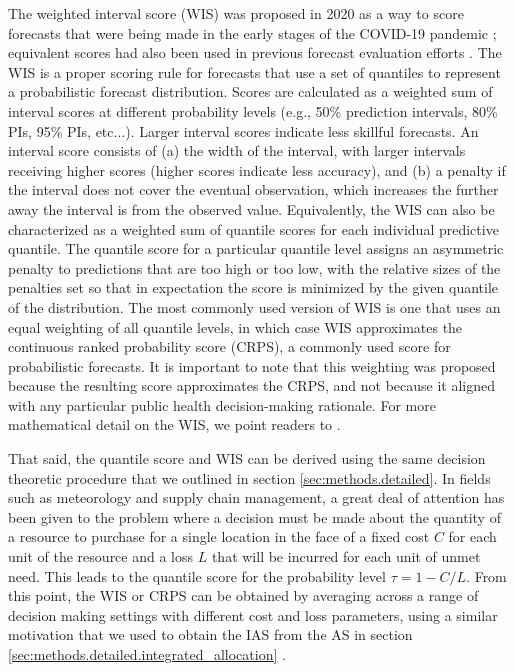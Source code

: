 \documentclass{article}
\begin{document}
The weighted interval score (WIS) was proposed in 2020 as a way to score forecasts that were being made in the early
stages of the COVID-19 pandemic \citep{bracher2021evaluating}; equivalent scores had also been used in previous forecast
evaluation efforts \cite[e.g.,][]{hong2016probabilisticEnergyForecasting}. The WIS is a proper scoring rule for
forecasts that use a set of quantiles to represent a probabilistic forecast distribution. Scores are calculated as a weighted sum of
interval scores at different probability levels (e.g., 50\% prediction intervals, 80\% PIs, 95\% PIs, etc...). Larger
interval scores indicate less skillful forecasts. An interval score consists of (a) the width of the interval, with
larger intervals receiving higher scores (higher scores indicate less accuracy), and (b) a penalty if the interval does
not cover the eventual observation, which increases the further away the interval is from the observed value.
Equivalently, the WIS can also be characterized as a weighted sum of quantile scores for each individual predictive
quantile. The quantile score for a particular quantile level assigns an asymmetric penalty to predictions that are too
high or too low, with the relative sizes of the penalties set so that in expectation the score is minimized by the given
quantile of the distribution. The most commonly used version of WIS is one that uses an equal weighting of all quantile
levels, in which case WIS approximates the continuous ranked probability score (CRPS), a commonly used score for
probabilistic forecasts. It is important to note that this weighting was proposed because the resulting score
approximates the CRPS, and not because it aligned with any particular public health decision-making rationale. For more mathematical detail on the WIS, we point readers to \cite{bracher2021evaluating}.

That said, the quantile score and WIS can be derived using the same decision theoretic procedure that we outlined in
section \ref{sec:methods.detailed}. In fields such as meteorology and supply chain management, a great deal of attention
has been given to the problem where a decision must be made about the quantity of a resource to purchase for a single
location in the face of a fixed cost $C$ for each unit of the resource and a loss $L$ that will be incurred for each
unit of unmet need. This leads to the quantile score for the probability level $\tau = 1 - C/L$. From this point, the
WIS or CRPS can be obtained by averaging across a range of decision making settings with different cost and loss
parameters, using a similar motivation that we used to obtain the IAS from the AS in section
\ref{sec:methods.detailed.integrated_allocation} \citep{gneiting2011weightedScoringRules}.
\end{document}
